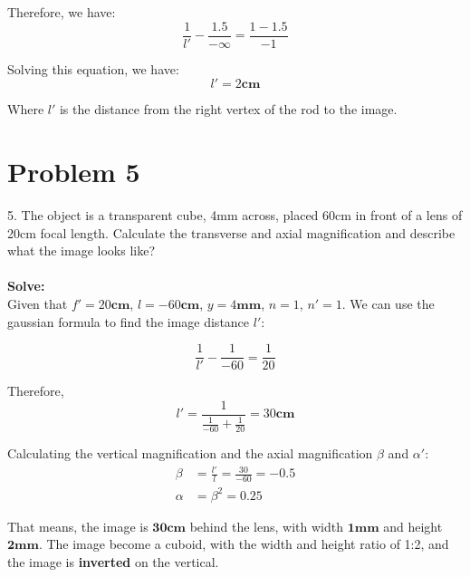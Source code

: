\documentclass{article}
\begin{document}
Therefore, we have:
\begin{equation}
    \frac{1}{l'} - \frac{1.5}{-\infty} = \frac{1-1.5}{-1}
\end{equation}

Solving this equation, we have:
\begin{equation}
    \boxed{
        l' =2\mathbf{cm}
    }
\end{equation}

Where $l'$ is the distance from the right vertex of the rod to the image.

\section{Problem 5}

5. The object is a transparent cube, 4mm across, placed 60cm in front of a lens of 20cm focal length.
Calculate the transverse and axial magnification and describe what the image looks like?\\\\
\textbf{Solve:}\\

Given that $f' = 20\mathbf{cm}$, $l = -60\mathbf{cm}$, $y = 4\mathbf{mm}$, $n = 1$, $n' = 1$. We can use the gaussian formula to find the image distance $l'$:

\begin{equation}
    \frac{1}{l'}-\frac{1}{-60} = \frac{1}{20}
\end{equation}

Therefore,
\begin{equation}
    \boxed{
        l' = \frac{1}{\frac{1}{-60} + \frac{1}{20}} = 30\mathbf{cm}
    }
\end{equation}

Calculating the vertical magnification and the axial magnification $\beta$ and $\alpha'$:
\begin{equation}
    \boxed{
        \begin{aligned}
            \beta  & = \frac{l'}{l} = \frac{30}{-60} = -0.5 \\
            \alpha & =  \beta^2 = 0.25
        \end{aligned}
    }
\end{equation}

That means, the image is $\mathbf{30cm}$ behind the lens, with width $\mathbf{1mm}$ and height $\mathbf{2mm}$. The image become a cuboid, with the width and height ratio of 1:2, and the image is \textbf{inverted} on the vertical.
\end{document}
